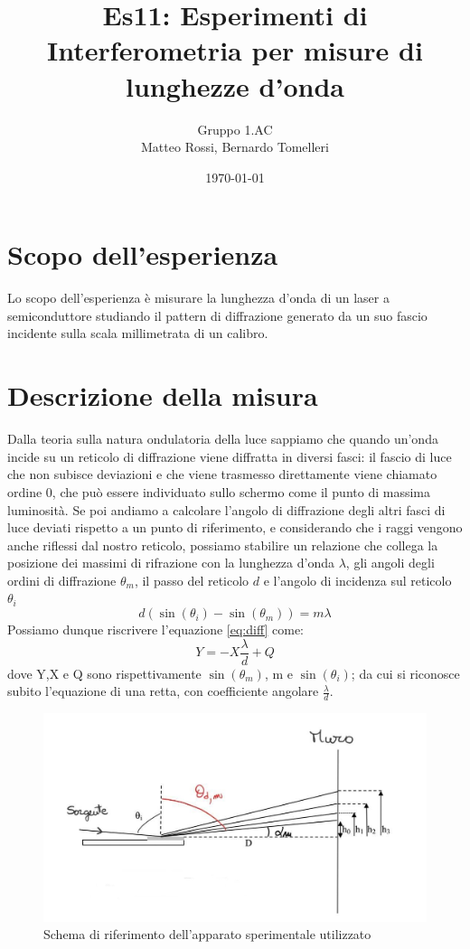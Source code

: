 \documentclass[10pt, a4paper, italian]{article}
\author{Gruppo 1.AC \\ Matteo Rossi, Bernardo Tomelleri}
\title{Es11: Esperimenti di Interferometria per misure di lunghezze d'onda}
\begin{document}
\date{\today}
\maketitle

\section{Scopo dell'esperienza}
Lo scopo dell'esperienza è misurare la lunghezza d'onda di un laser
a semiconduttore studiando il pattern di diffrazione generato da un suo
fascio incidente sulla scala millimetrata di un calibro.

\section{Descrizione della misura}
Dalla teoria sulla natura ondulatoria della luce sappiamo che quando un'onda incide su un reticolo di diffrazione viene diffratta in diversi fasci: il fascio di luce che non subisce deviazioni e che viene trasmesso direttamente viene chiamato ordine 0, che può essere individuato sullo schermo come il punto di massima luminosità. Se poi andiamo a calcolare l'angolo di diffrazione degli altri fasci di luce deviati rispetto a un punto di riferimento, e considerando che i raggi vengono anche riflessi dal nostro reticolo, possiamo stabilire un relazione che collega la posizione dei massimi di rifrazione con la lunghezza d'onda $\lambda$, gli angoli degli ordini di diffrazione $\theta _m$, il passo del reticolo $d$ e l'angolo di incidenza sul reticolo $\theta _i$
\begin{equation}
d(\sin(\theta _i) - \sin(\theta _m))=m \lambda
\label{eq:diff}
\end{equation}
Possiamo dunque riscrivere l'equazione \ref{eq:diff} come:
\begin{equation}
Y= -X \frac{\lambda}{d} +Q
\label{eq:fit}
\end{equation}
dove Y,X e Q sono rispettivamente $\sin(\theta _m)$, m e $\sin(\theta _i)$; da cui si riconosce subito l'equazione di una retta, con coefficiente angolare $\frac{\lambda}{d}$.
\begin{figure}
\includegraphics[width=\textwidth]{0}
\caption{ \label{schema1} Schema di riferimento dell'apparato sperimentale utilizzato}
\end{figure}
\end{document}

